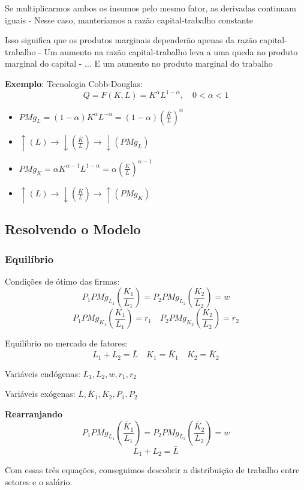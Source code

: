 \documentclass[a4paper,12pt]{article}[abntex2]
\begin{document}
Se multiplicarmos ambos os insumos pelo mesmo fator, as derivadas continuam iguais  
- Nesse caso, manteríamos a razão capital-trabalho constante

Isso significa que os produtos marginais dependerão apenas da razão capital-trabalho  
- Um aumento na razão capital-trabalho leva a uma queda no produto marginal do capital  
- ... E um aumento no produto marginal do trabalho

\textbf{Exemplo}: Tecnologia Cobb-Douglas:  
\[
Q = F(K, L) = K^{\alpha} L^{1 - \alpha}, \quad 0 < \alpha < 1
\]
\begin{itemize}
    \item \(PMg_L=(1-\alpha)K^{\alpha}L^{-\alpha}=(1-\alpha) \left (\frac{\bar{K}}{L}\right)^{\alpha}\)
    \item \(\uparrow(L) \rightarrow \downarrow(\frac{\bar{K}}{L})\rightarrow \downarrow (PMg_L)\)
    \item \(PMg_K=\alpha K^{\alpha-1}L^{1-\alpha}=\alpha \left (\frac{\bar{K}}{L}\right)^{\alpha-1}\)
    \item \(\uparrow(L) \rightarrow \downarrow(\frac{\bar{K}}{L})\rightarrow \uparrow (PMg_K)\)
\end{itemize}


\subsection{\textbf{Resolvendo o Modelo}}
\subsubsection{\textbf{Equilíbrio}}
Condições de ótimo das firmas:
\[
P_1 PMg_{L_1} \left( \frac{K_1}{L_1} \right) = P_2 PMg_{L_2} \left( \frac{K_2}{L_2} \right) = w
\]
\[
P_1 PMg_{K_1} \left( \frac{K_1}{L_1} \right) = r_1
\quad
P_2 PMg_{K_2} \left( \frac{K_2}{L_2} \right) = r_2
\]

Equilíbrio no mercado de fatores:
\[
L_1 + L_2 = \bar{L}
\quad
K_1 = \bar{K}_1
\quad
K_2 = \bar{K}_2
\]

Variáveis endógenas: $L_1, L_2, w, r_1, r_2$  

Variáveis exógenas: $\bar{L}, \bar{K}_1, \bar{K}_2, P_1, P_2$

\textbf{Rearranjando}
\[
P_1 PMg_{L_1} \left( \frac{\bar{K}_1}{L_1} \right) = P_2 PMg_{L_2} \left( \frac{\bar{K}_2}{L_2} \right) = w
\]
\[
L_1 + L_2 = \bar{L}
\]

Com essas três equações, conseguimos descobrir a distribuição de trabalho entre setores e o salário.
\end{document}
